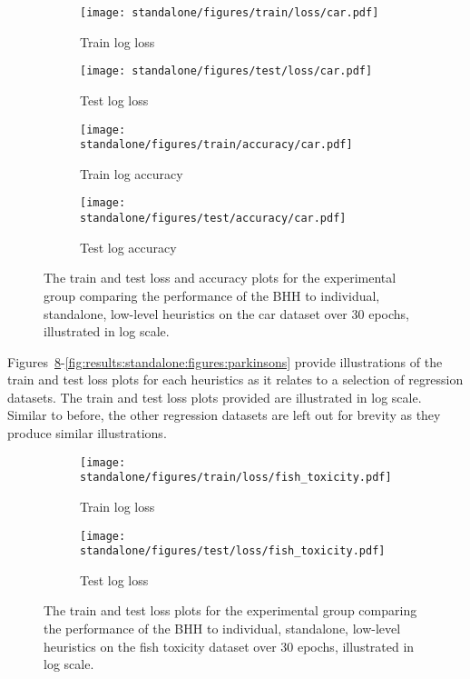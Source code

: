 \begin{figure}[H]
	\begin{subfigure}{0.5\textwidth}
		\centering
		\texttt{[image: standalone/figures/train/loss/car.pdf]}
		\caption{Train log loss}
		\label{fig:results:standalone:figures:loss:train:car}
	\end{subfigure}
	\begin{subfigure}{0.5\textwidth}
		\centering
		\texttt{[image: standalone/figures/test/loss/car.pdf]}
		\caption{Test log loss}
		\label{fig:results:standalone:figures:loss:test:car}
	\end{subfigure}
	\par\bigskip
	\begin{subfigure}{0.5\textwidth}
		\centering
		\texttt{[image: standalone/figures/train/accuracy/car.pdf]}
		\caption{Train log accuracy}
		\label{fig:results:standalone:figures:accuracy:train:car}
	\end{subfigure}
	\begin{subfigure}{0.5\textwidth}
		\centering
		\texttt{[image: standalone/figures/test/accuracy/car.pdf]}
		\caption{Test log accuracy}
		\label{fig:results:standalone:figures:accuracy:test:car}
	\end{subfigure}
	\par\bigskip
	\caption{The train and test loss and accuracy plots for the experimental group comparing the performance of the \acs{BHH} to individual, standalone, low-level heuristics on the car dataset over 30 epochs, illustrated in log scale.}
	\label{fig:results:standalone:figures:car}
\end{figure}

Figures~\ref{fig:results:standalone:figures:fish_toxicity}-\ref{fig:results:standalone:figures:parkinsons} provide illustrations of the train and test loss plots for each heuristics as it relates to a selection of regression datasets. The train and test loss plots provided are illustrated in log scale. Similar to before, the other regression datasets are left out for brevity as they produce similar illustrations.

\begin{figure}[H]
	\begin{subfigure}{0.5\textwidth}
		\centering
		\texttt{[image: standalone/figures/train/loss/fish\_toxicity.pdf]}
		\caption{Train log loss}
		\label{fig:results:standalone:figures:loss:train:fish_toxicity}
	\end{subfigure}
	\begin{subfigure}{0.5\textwidth}
		\centering
		\texttt{[image: standalone/figures/test/loss/fish\_toxicity.pdf]}
		\caption{Test log loss}
		\label{fig:results:standalone:figures:loss:test:fish_toxicity}
	\end{subfigure}
	\par\bigskip
	\caption{The train and test loss plots for the experimental group comparing the performance of the \acs{BHH} to individual, standalone, low-level heuristics on the fish toxicity dataset over 30 epochs, illustrated in log scale.}
	\label{fig:results:standalone:figures:fish_toxicity}
\end{figure}


